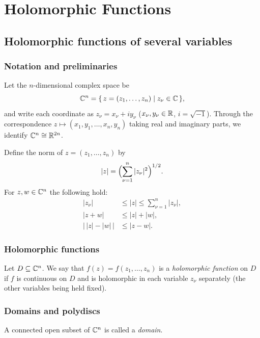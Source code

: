 \chapter{Holomorphic Functions}

\section{Holomorphic functions of several variables}

\subsection*{Notation and preliminaries}

Let the $n$-dimensional complex space be
\[
  \mathbb{C}^n = \{\, z = (z_1, \dots, z_n) \mid z_\nu \in \mathbb{C} \,\},
\]
and write each coordinate as $z_\nu = x_\nu + i y_\nu$
($x_\nu, y_\nu \in \mathbb{R}$, $i = \sqrt{-1}$). Through the correspondence
$z \mapsto (x_1, y_1, \dots, x_n, y_n)$ taking real and imaginary parts, we
identify $\mathbb{C}^n \cong \mathbb{R}^{2n}$.

Define the norm of $z = (z_1, \dots, z_n)$ by
\[
  |z| = \Bigl( \sum_{\nu=1}^{n} |z_\nu|^2 \Bigr)^{1/2}.
\]
For $z, w \in \mathbb{C}^n$ the following hold:
\begin{align}
  |z_\nu| &\le |z| \le \sum_{\nu=1}^n |z_\nu|, \\
  |z + w| &\le |z| + |w|, \\
  \bigl|\, |z| - |w| \,\bigr| &\le |z - w|.
\end{align}

\subsection*{Holomorphic functions}

\begin{definition}\label{def:holomorphic}
Let $D \subseteq \mathbb{C}^n$. We say that $f(z) = f(z_1, \dots, z_n)$ is a
\emph{holomorphic function} on $D$ if $f$ is continuous on $D$ and is
holomorphic in each variable $z_\nu$ separately (the other variables being held
fixed).
\end{definition}

\subsection*{Domains and polydiscs}

\begin{definition}[domain]
A connected open subset of $\mathbb{C}^n$ is called a \emph{domain}.
\end{definition}

